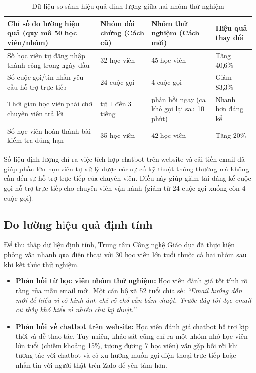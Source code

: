 \begin{table}[htbp]
\centering
\fontsize{10}{13}\selectfont
\begin{tabular}{|p{5.2cm}|p{2.6cm}|p{3.2cm}|p{2.2cm}|}
\hline
\textbf{Chỉ số đo lường hiệu quả (quy mô 50 học viên/nhóm)} & \textbf{Nhóm đối chứng (Cách cũ)} & \textbf{Nhóm thử nghiệm (Cách mới)} & \textbf{Hiệu quả thay đổi} \\ \hline
Số học viên tự đăng nhập thành công trong ngày đầu & 32 học viên & 45 học viên & Tăng 40,6\% \\ \hline
Số cuộc gọi/tin nhắn yêu cầu hỗ trợ trực tiếp & 24 cuộc gọi & 4 cuộc gọi & Giảm 83,3\% \\ \hline
Thời gian học viên phải chờ chuyên viên trả lời & từ 1 đến 3 tiếng & phản hồi ngay (ca khó gọi lại sau 10 phút) & Nhanh hơn đáng kể \\ \hline
Số học viên hoàn thành bài kiểm tra đúng hạn & 35 học viên & 42 học viên & Tăng 20\% \\ \hline
\end{tabular}
\caption{Dữ liệu so sánh hiệu quả định lượng giữa hai nhóm thử nghiệm}
\label{tab:results_quant}
\end{table}

Số liệu định lượng chỉ ra việc tích hợp chatbot trên website và cải tiến email đã giúp phần lớn học viên tự xử lý được các sự cố kỹ thuật thông thường mà không cần đến sự hỗ trợ trực tiếp của chuyên viên. Điều này giúp giảm tải đáng kể cuộc gọi hỗ trợ trực tiếp cho chuyên viên vận hành (giảm từ 24 cuộc gọi xuống còn 4 cuộc gọi).

\subsection{Đo lường hiệu quả định tính}

Để thu thập dữ liệu định tính, Trung tâm Công nghệ Giáo dục đã thực hiện phỏng vấn nhanh qua điện thoại với 30 học viên lớn tuổi thuộc cả hai nhóm sau khi kết thúc thử nghiệm.

\begin{itemize}
    \item \textbf{Phản hồi từ học viên nhóm thử nghiệm:} Học viên đánh giá tốt tính rõ ràng của mẫu email mới. Một cán bộ xã 52 tuổi chia sẻ: \textit{``Email hướng dẫn mới dễ hiểu vì có hình ảnh chỉ rõ chỗ cần bấm chuột. Trước đây tôi đọc email cũ thấy khó hiểu vì nhiều chữ kỹ thuật.''}
    \item \textbf{Phản hồi về chatbot trên website:} Học viên đánh giá chatbot hỗ trợ kịp thời và dễ thao tác. Tuy nhiên, khảo sát cũng chỉ ra một nhóm nhỏ học viên lớn tuổi (chiếm khoảng 15\%, tương đương 7 học viên) vẫn gặp bối rối khi tương tác với chatbot và có xu hướng muốn gọi điện thoại trực tiếp hoặc nhắn tin với người thật trên Zalo để yên tâm hơn.
\end{itemize}
